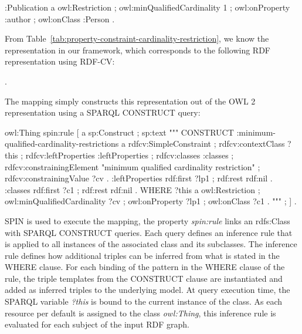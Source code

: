 \documentclass[a4paper,fontsize=11pt]{scrartcl}
\begin{document}
\begin{ex}[commandchars=\\\{\}]
:Publication 
    a owl:Restriction ;
    owl:minQualifiedCardinality 1 ;
    owl:onProperty :author ;
    owl:onClass :Person .
\end{ex}

From Table~\ref{tab:property-constraint-cardinality-restriction}, we know the representation in our framework, which corresponds to the following 
RDF representation using RDF-CV:

\begin{ex} .
\end{ex}

The mapping simply constructs this representation out of the OWL 2 representation using a SPARQL CONSTRUCT query: 

\begin{ex}
owl:Thing 
    spin:rule [ a sp:Construct ; sp:text """
        CONSTRUCT {            
            :minimum-qualified-cardinality-restrictions
                a rdfcv:SimpleConstraint ;
                rdfcv:contextClass ?this ;
                rdfcv:leftProperties :leftProperties ;
                rdfcv:classes :classes ;
                rdfcv:constrainingElement "minimum qualified cardinality restriction" ;
                rdfcv:constrainingValue ?cv .  
            :leftProperties 
                rdf:first ?lp1 ;
                rdf:rest rdf:nil .    
            :classes 
                rdf:first ?c1 ;
                rdf:rest rdf:nil . }
        WHERE {
            ?this
                a owl:Restriction ;
                owl:minQualifiedCardinality ?cv ;
                owl:onProperty ?lp1 ;
                owl:onClass ?c1 . } """ ; ] .
\end{ex}

SPIN is used to execute the mapping, the property \emph{spin:rule} links an rdfs:Class with SPARQL CONSTRUCT queries. Each query defines an inference rule that is applied to all instances of the associated class and its subclasses. The inference rule defines how additional triples can be inferred from what is stated in the WHERE clause. For each binding of the pattern in the WHERE clause of the rule, the triple templates from the CONSTRUCT clause are instantiated and added as inferred triples to the underlying model. At query execution time, the SPARQL variable \emph{?this} is bound to the current instance of the class. As each resource per default is assigned to the class \emph{owl:Thing}, this inference rule is evaluated for each subject of the input RDF graph.
\end{document}
